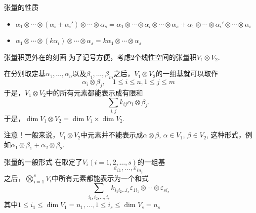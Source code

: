 
\begin{frame}

\begin{block}{张量的性质}
\begin{itemize}
\item<1-> $\alpha_1\otimes\cdots\otimes(\alpha_i+\alpha_i')\otimes\cdots\otimes\alpha_s = \alpha_1\otimes\cdots\otimes\alpha_i\otimes\cdots\otimes\alpha_s + \alpha_1\otimes\cdots\otimes\alpha_i'\otimes\cdots\otimes\alpha_s$
\vspace{1em}
\item<2-> $\alpha_1\otimes\cdots\otimes(k\alpha_i)\otimes\cdots\otimes\alpha_s = k \alpha_1\otimes\cdots\otimes\alpha_s$
\end{itemize}
\end{block}

\end{frame}


\begin{frame}

\begin{block}{张量积更外在的刻画}
为了记号方便，考虑2个线性空间的张量积$V_1\otimes V_2$.

\vspace{1em}
\pause

在分别取定基$\alpha_1,\ldots,\alpha_n$以及$\beta_1,\ldots,\beta_m$之后，$V_1\otimes V_2$的一组基就可以取作
$$\alpha_i\otimes \beta_j, \quad 1\leqslant i\leqslant n, 1\leqslant j\leqslant m$$
于是，$V_1\otimes V_2$中的所有元素都能表示成有限和
$$\sum\limits_{i,j} k_{ij} \alpha_i\otimes \beta_j.$$
于是，$\dim V_1\otimes V_2 = \dim V_1 \times \dim V_2.$

\vspace{1em}
\pause

{\color{red}注意}！一般来说，$V_1\otimes V_2$中元素并不能表示成$\alpha\otimes\beta$, $\alpha\in V_1$, $\beta\in V_2$, 这种形式，例如$\alpha_1\otimes \beta_1 + \alpha_2\otimes\beta_2$.
\end{block}

\end{frame}


\begin{frame}

\begin{block}{张量的一般形式}
在取定了$V_i (i=1,2,\ldots,s)$的一组基
$$\varepsilon_{i1},\ldots,\varepsilon_{in_i}$$
之后，$\bigotimes\limits_{i=1}^s V_i$中所有元素都能表示为一个和式
$$\sum\limits_{i_1,i_2,\ldots,i_s} k_{i_1i_2\ldots i_s} \varepsilon_{1i_1} \otimes \cdots \otimes \varepsilon_{si_s}$$
其中$1\leqslant i_1\leqslant \dim V_1 = n_1, \ldots, 1\leqslant i_s\leqslant \dim V_s = n_s$
\end{block}

\end{frame}

